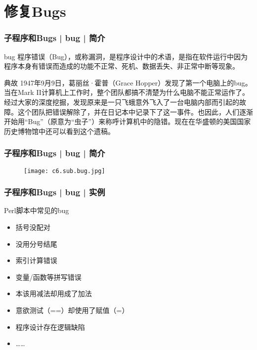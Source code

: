 \section{修复Bugs}
\begin{frame}
  \frametitle{子程序和Bugs | bug | 简介}
  \begin{block}{bug}
程序错误（Bug），或称漏洞，是程序设计中的术语，是指在软件运行中因为程序本身有错误而造成的功能不正常、死机、数据丢失、非正常中断等现象。
  \end{block}
  \pause
  \begin{block}{典故}
    1947年9月9日，葛丽丝·霍普（Grace Hopper）发现了第一个电脑上的bug。当在Mark II计算机上工作时，整个团队都搞不清楚为什么电脑不能正常运作了。经过大家的深度挖掘，发现原来是一只飞蛾意外飞入了一台电脑内部而引起的故障。这个团队把错误解除了，并在日记本中记录下了这一事件。也因此，人们逐渐开始用“Bug”（原意为“虫子”）来称呼计算机中的隐错。现在在华盛顿的美国国家历史博物馆中还可以看到这个遗稿。
  \end{block}
\end{frame}

\begin{frame}
  \frametitle{子程序和Bugs | bug | 简介}
  \begin{figure}
    \centering
    \texttt{[image: c6.sub.bug.jpg]}
  \end{figure}
\end{frame}

\begin{frame}
  \frametitle{子程序和Bugs | bug | \alert{实例}}
  \begin{block}{Perl脚本中常见的bug}
    \begin{itemize}
      \item 括号没配对
      \item 没用分号结尾
      \item 索引计算错误
      \item 变量/函数等拼写错误
      \item 本该用减法却用成了加法
      \item 意欲测试（==）却使用了赋值（=）
      \item 程序设计存在逻辑缺陷
      \item ……
    \end{itemize}
  \end{block}
\end{frame}

